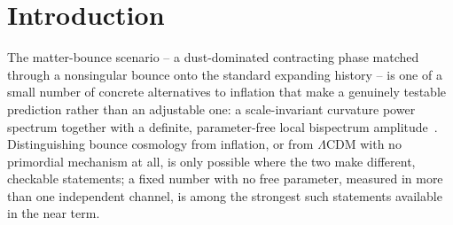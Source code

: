 \documentclass[aps,prd,twocolumn,superscriptaddress,nofootinbib,longbibliography]{revtex4-2}
\newcommand{\fnl}{f_{\rm NL}}
\newcommand{\fpbh}{f_{\rm PBH}}
\begin{document}
\begin{abstract}
$r\simeq1.8$ is already $49\times$ BICEP/Keck), and Planck's $95\%$
interval needs $c_s\ge0.525$ ($r\ge12.6$). The windows are disjoint by $\sim350\times$
in $c_s$: \emph{the single-field matter bounce, for the full $P(X)$
$k$-essence class at constant sound speed, is jointly excluded by $r$
and $\fnl$ here}; $r$ and the bounce term are exactly
$\lambda$-independent (the cubic coefficient cancels by parity in the
bounce window), the best case (DBI) giving $r_{\rm min}=10.3$ on the
same $95\%$ criterion. A
time-dependent $c_s(\eta)$ is not covered. A curvaton-type spectator is
$(r,n_s)$-viable but dilutes $-35/16$ by weight $(r/24)^2$, below a
$1\sigma$ SPHEREx-class detection for every tensor-viable $r$; a
concrete prediction needs an unmodelled entropy sector. Three channels
remain conditional checks on the excluded background: pulsar timing
($\gamma_{\rm pred}=5.07$ vs.\ NANOGrav's $3.2\pm0.6$, a $90\%$
half-width, i.e.\ a $5.1\sigma$
null), PBHs (ratio $1.81\pm0.02$ over the perturbatively controlled points of this model's own
$\gamma_{\rm cr}$ coverage, $6.7$--$7.0$ decades short,
$\fpbh=0$), and SMBH seeds (FIRAS-excluded); DESI DR1 cannot separate
candidates. The contribution is the exact
amplitude, the $\lambda$-general no-go, and the surviving curvaton
route.
\end{abstract}

\maketitle

\section{Introduction}
\label{sec:intro}

The matter-bounce scenario -- a dust-dominated contracting phase matched through
a nonsingular bounce onto the standard expanding history -- is one of a small
number of concrete alternatives to inflation that make a genuinely testable
prediction rather than an adjustable one: a scale-invariant curvature power
spectrum together with a definite, parameter-free local bispectrum
amplitude~\cite{Cai2009,CaiEasson2012,Quintin2015}. Distinguishing bounce
cosmology from inflation, or from $\Lambda$CDM with no primordial mechanism at
all, is only possible where the two make different, checkable statements; a
fixed number with no free parameter, measured in more than one independent
channel, is among the strongest such statements available in the near term.
\end{document}
